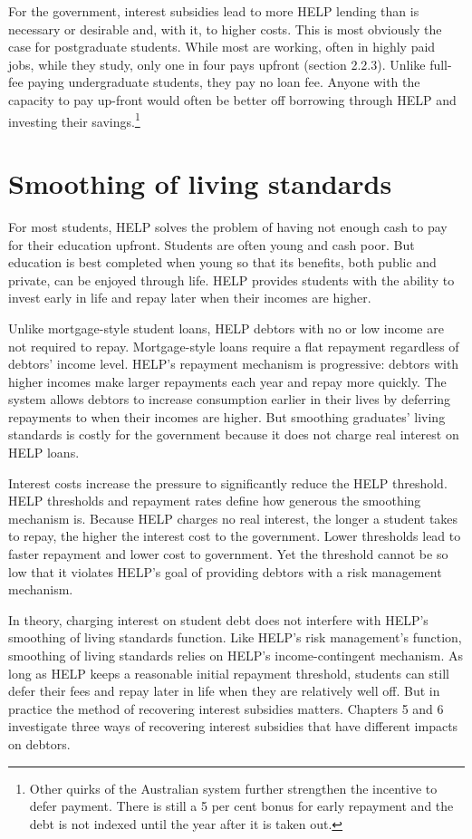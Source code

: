 \documentclass[embargoed]{grattan}
\begin{document}
For the government, interest subsidies lead to more HELP lending than is necessary or desirable and, with it, to higher costs. This is most obviously the case for postgraduate students. While most are working, often in highly paid jobs, while they study, only one in four pays upfront (section 2.2.3). Unlike full-fee paying undergraduate students, they pay no loan fee. Anyone with the capacity to pay up-front would often be better off borrowing through HELP and investing their savings.\footnote{Other quirks of the Australian system further strengthen the incentive to defer payment. There is still a 5 per cent bonus for early repayment and the debt is not indexed until the year after it is taken out.}

\section{Smoothing of living standards}\label{smoothing-of-living-standards}

For most students, HELP solves the problem of having not enough cash to pay for their education upfront. Students are often young and cash poor. But education is best completed when young so that its benefits, both public and private, can be enjoyed through life. HELP provides students with the ability to invest early in life and repay later when their incomes are higher.

Unlike mortgage-style student loans, HELP debtors with no or low income are not required to repay. Mortgage-style loans require a flat repayment regardless of debtors' income level. HELP's repayment mechanism is progressive: debtors with higher incomes make larger repayments each year and repay more quickly. The system allows debtors to increase consumption earlier in their lives by deferring repayments to when their incomes are higher. But smoothing graduates' living standards is costly for the government because it does not charge real interest on HELP loans.

Interest costs increase the pressure to significantly reduce the HELP threshold. HELP thresholds and repayment rates define how generous the smoothing mechanism is. Because HELP charges no real interest, the longer a student takes to repay, the higher the interest cost to the government. Lower thresholds lead to faster repayment and lower cost to government. Yet the threshold cannot be so low that it violates HELP's goal of providing debtors with a risk management mechanism.

In theory, charging interest on student debt does not interfere with HELP's smoothing of living standards function. Like HELP's risk management's function, smoothing of living standards relies on HELP's income-contingent mechanism. As long as HELP keeps a reasonable initial repayment threshold, students can still defer their fees and repay later in life when they are relatively well off. \protect\hypertarget{_Ref435627338}{}{}But in practice the method of recovering interest subsidies matters. Chapters 5 and 6 investigate three ways of recovering interest subsidies that have different impacts on debtors.
\end{document}
